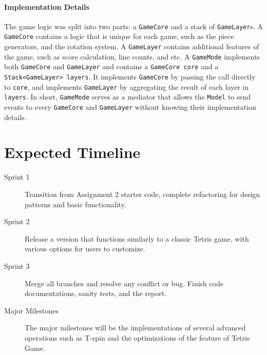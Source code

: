 \documentclass{article}
\begin{document}
\begin{figure}[H]
\centering

\end{figure}

\paragraph{Implementation Details}

The game logic was split into two parts: a \verb|GameCore| and a stack of \verb|GameLayer|s. A \verb|GameCore| contains a logic that is unique for each game, such as the piece generators, and the rotation system. A \verb|GameLayer| contains additional features of the game, such as score calculation, line counts, and etc. A \verb|GameMode| implements both \verb|GameCore| and \verb|GameLayer| and contains a \verb|GameCore core| and a \verb|Stack<GameLayer> layers|. It implements \verb|GameCore| by passing the call directly to \verb|core|, and implements \verb|GameLayer| by aggregating the result of each layer in \verb|layers|. In short, \verb|GameMode| serves as a mediator that allows the \verb|Model| to send events to every \verb|GameCore| and \verb|GameLayer| without knowing their implementation details.

\clearpage

\section{Expected Timeline}

\begin{description}
\item[Sprint 1] Transition from Assignment 2 starter code, complete refactoring for design patterns and basic functionality.
\item[Sprint 2] Release a version that functions similarly to a classic Tetris game, with various options for users to customize.
\item[Sprint 3] Merge all branches and resolve any conflict or bug. Finish code documentations, sanity tests, and the report.
\item[Major Milestones] The major milestones will be the implementations of several advanced operations such as T-spin and the optimizations of the feature of Tetris Game.
\end{description}

\begin{figure}[H]
    
\end{figure}
\end{document}
